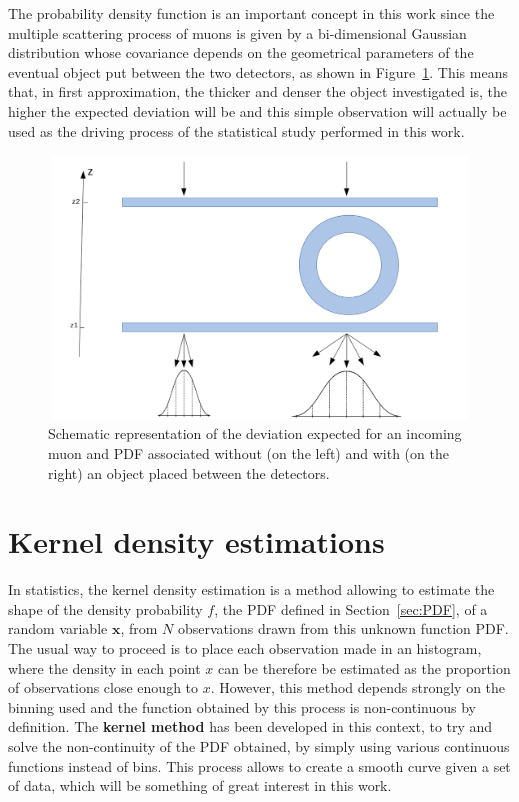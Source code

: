 \documentclass[a4paper, 11pt]{report}
\begin{document}
The probability density function is an important concept in this work since the multiple scattering process of muons is given by a bi-dimensional Gaussian distribution whose covariance depends on the geometrical parameters of the eventual object put between the two detectors, as shown in Figure~\ref{fig:deviation}. This means that, in first approximation, the thicker and denser the object investigated is, the higher the expected deviation will be and this simple observation will actually be used as the driving process of the statistical study performed in this work.

\begin{figure}[htbp]
\centering
\includegraphics[width=11.5cm, height=7cm]{figs/pdfs.png}
\caption{Schematic representation of the deviation expected for an incoming muon and PDF associated without (on the left) and with (on the right) an object placed between the detectors.}
\label{fig:deviation}
\end{figure}

\section{Kernel density estimations} \label{sec:KDF}

In statistics, the kernel density estimation is a method allowing to estimate the shape of the density probability $f$, the PDF defined in Section~\ref{sec:PDF}, of a random variable $\bm x$, from $N$ observations drawn from this unknown function PDF. The usual way to proceed is to place each observation made in an histogram, where the density in each point $x$ can be therefore be estimated as the proportion of observations close enough to $x$. However, this method depends strongly on the binning used and the function obtained by this process is non-continuous by definition. The \textbf{kernel method} has been developed in this context, to try and solve the non-continuity of the PDF obtained, by simply using various continuous functions instead of bins. This process allows to create a smooth curve given a set of data, which will be something of great interest in this work.
\end{document}
